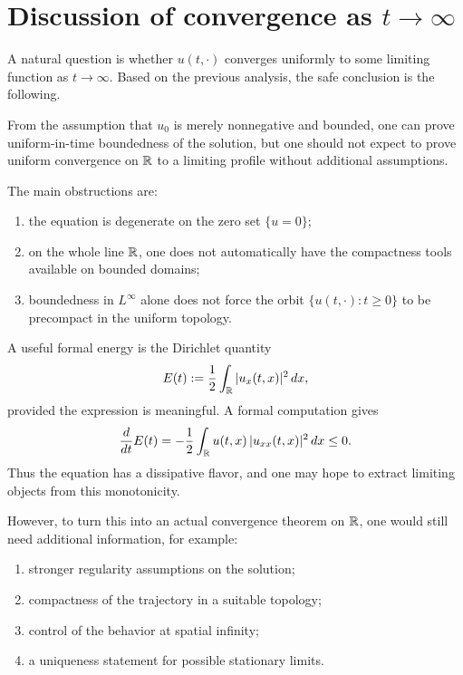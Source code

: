 \section{Discussion of convergence as $t\to\infty$}

A natural question is whether $u(t,\cdot)$ converges uniformly to some limiting function as $t\to\infty$. Based on the previous analysis, the safe conclusion is the following.

\begin{proposition}
From the assumption that $u_0$ is merely nonnegative and bounded, one can prove uniform-in-time boundedness of the solution, but one should not expect to prove uniform convergence on $\mathbb{R}$ to a limiting profile without additional assumptions.
\end{proposition}

The main obstructions are:
\begin{enumerate}[leftmargin=2em]
    \item the equation is degenerate on the zero set $\{u=0\}$;
    \item on the whole line $\mathbb{R}$, one does not automatically have the compactness tools available on bounded domains;
    \item boundedness in $L^{\infty}$ alone does not force the orbit $\{u(t,\cdot):t\ge 0\}$ to be precompact in the uniform topology.
\end{enumerate}

A useful formal energy is the Dirichlet quantity
\[
    E(t):=\frac12\int_{\mathbb{R}}|u_x(t,x)|^2\,dx,
\]
provided the expression is meaningful. A formal computation gives
\[
    \frac{d}{dt}E(t)
    = -\frac12\int_{\mathbb{R}} u(t,x)\,|u_{xx}(t,x)|^2\,dx \le 0.
\]
Thus the equation has a dissipative flavor, and one may hope to extract limiting objects from this monotonicity.

However, to turn this into an actual convergence theorem on $\mathbb{R}$, one would still need additional information, for example:
\begin{enumerate}[leftmargin=2em]
    \item stronger regularity assumptions on the solution;
    \item compactness of the trajectory in a suitable topology;
    \item control of the behavior at spatial infinity;
    \item a uniqueness statement for possible stationary limits.
\end{enumerate}

